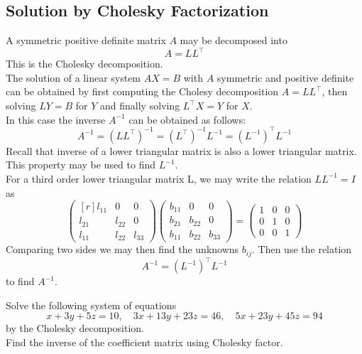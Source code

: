 \documentclass[12pt,class=book,crop=false]{standalone}
\begin{document}
\subsection{Solution by Cholesky Factorization}
A symmetric positive definite matrix $ A $ may be decomposed into
\[
    A=LL^\top
\]
This is the Cholesky decomposition.\\
The solution of a linear system $ AX = B $ with $ A $ symmetric and positive definite can be obtained by first computing the Cholesy decomposition $ A=LL^\top $, then solving  $ LY = B $ for $ Y $ and finally solving $L^\top X=Y$ for $ X $.\\
In this case the inverse $ {A}^{-1} $ can be obtained as follows:
\[
    {A}^{-1}=\left(L L^\top\right)^{-1}=\left(L^\top\right)^{-1}{L}^{-1}=\left({L}^{-1}\right)^\top {L}^{-1}
\]
Recall that inverse of a lower triangular matrix is also a lower triangular matrix. This property may be used to find $ {L}^{-1}. $\\
For a third order lower triangular matrix L, we may write the relation $ {L}{L}^{-1}={I} $ as
\[
    \begin{pmatrix*}[r]
        l_{11}&0&0\\
        l_{21}&l_{22}& 0\\
        l_{11}&l_{22}&l_{33}
    \end{pmatrix*}
    \begin{pmatrix}
        b_{11} & 0      & 0      \\
        b_{21} & b_{22} & 0      \\
        b_{11} & b_{22} & b_{33}
    \end{pmatrix}
    =\begin{pmatrix}
        1 & 0 & 0 \\
        0 & 1 & 0 \\
        0 & 0 & 1
    \end{pmatrix}
\]
Comparing two sides we may then find the unknowns $ b_{ij} $. Then use the relation
\[
    {A}^{-1}=\left({L}^{-1}\right)^\top {L}^{-1}
\]
to find $ {A}^{-1} $.
\begin{prob}
    Solve the following system of equations
    \[
        x+3y+5z=10,\quad 3x+13y+23z=46,\quad 5x+23y+45z=94
    \]
    by the Cholesky decomposition.\\
    Find the inverse of the coefficient matrix using Cholesky factor.
\end{prob}
\end{document}
